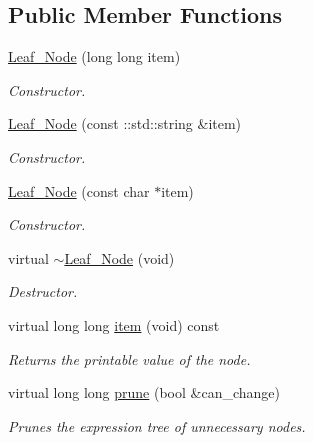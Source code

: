 \subsection*{Public Member Functions}
\begin{DoxyCompactItemize}
\item 
\hyperlink{classMadara_1_1Expression__Tree_1_1Leaf__Node_a8ba9271346a386eb746c6abd9553f635}{Leaf\_\-Node} (long long item)
\begin{DoxyCompactList}\small\item\em Constructor. \item\end{DoxyCompactList}\item 
\hyperlink{classMadara_1_1Expression__Tree_1_1Leaf__Node_ab3f10a560c91705bd89e0d77225c15e6}{Leaf\_\-Node} (const ::std::string \&item)
\begin{DoxyCompactList}\small\item\em Constructor. \item\end{DoxyCompactList}\item 
\hyperlink{classMadara_1_1Expression__Tree_1_1Leaf__Node_a48b6cbc578ae19bd0760cd33b2f7d159}{Leaf\_\-Node} (const char $\ast$item)
\begin{DoxyCompactList}\small\item\em Constructor. \item\end{DoxyCompactList}\item 
virtual \hyperlink{classMadara_1_1Expression__Tree_1_1Leaf__Node_ae5b0892cb270cceac4a140bb3e59fddf}{$\sim$Leaf\_\-Node} (void)
\begin{DoxyCompactList}\small\item\em Destructor. \item\end{DoxyCompactList}\item 
virtual long long \hyperlink{classMadara_1_1Expression__Tree_1_1Leaf__Node_a1daacf407d2be4039be668fe9fcd82e5}{item} (void) const 
\begin{DoxyCompactList}\small\item\em Returns the printable value of the node. \item\end{DoxyCompactList}\item 
virtual long long \hyperlink{classMadara_1_1Expression__Tree_1_1Leaf__Node_ab1fb385a485b5ee6d52b66d8c3cfb835}{prune} (bool \&can\_\-change)
\begin{DoxyCompactList}\small\item\em Prunes the expression tree of unnecessary nodes. \item\end{DoxyCompactList}\item 

\end{DoxyCompactItemize}
